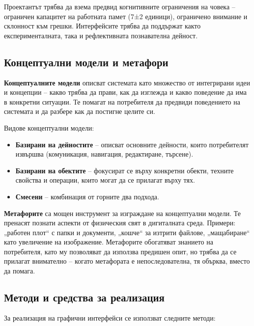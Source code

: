 \documentclass{scrartcl}
\begin{document}
\begin{FlushLeft}
Проектантът трябва да взема предвид когнитивните ограничения на човека – ограничен капацитет на работната памет (7±2 единици), ограничено внимание и склонност към грешки. Интерфейсите трябва да поддържат както експерименталната, така и рефлективната познавателна дейност.

\subsection{Концептуални модели и метафори}

\textbf{Концептуалните модели} описват системата като множество от интегрирани идеи и концепции – какво трябва да прави, как да изглежда и какво поведение да има в конкретни ситуации. Те помагат на потребителя да предвиди поведението на системата и да разбере как да постигне целите си.

Видове концептуални модели:
\begin{itemize}
    \item \textbf{Базирани на дейностите} – описват основните дейности, които потребителят извършва (комуникация, навигация, редактиране, търсене).
    \item \textbf{Базирани на обектите} – фокусират се върху конкретни обекти, техните свойства и операции, които могат да се прилагат върху тях.
    \item \textbf{Смесени} – комбинация от горните два подхода.
\end{itemize}

\textbf{Метафорите} са мощен инструмент за изграждане на концептуални модели. Те пренасят познати аспекти от физическия свят в дигиталната среда. Примери: „работен плот“ с папки и документи, „кошче“ за изтрити файлове, „мащабиране“ като увеличение на изображение. Метафорите обогатяват знанието на потребителя, като му позволяват да използва предишен опит, но трябва да се прилагат внимателно – когато метафората е непоследователна, тя обърква, вместо да помага.

\subsection{Методи и средства за реализация}

За реализация на графични интерфейси се използват следните методи:


\end{FlushLeft}
\end{document}
